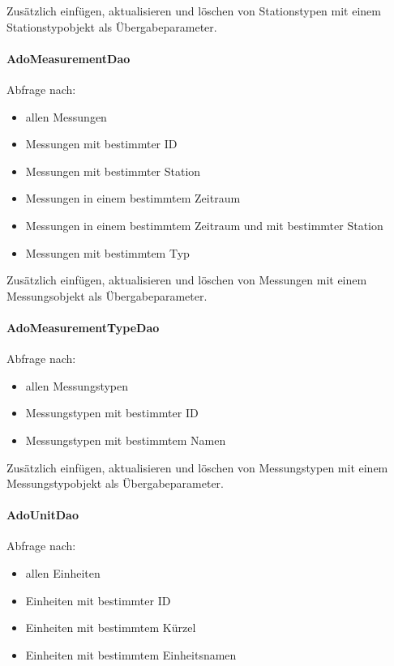 Zusätzlich einfügen, aktualisieren und löschen von Stationstypen mit
einem Stationstypobjekt als Übergabeparameter.


\paragraph{AdoMeasurementDao}\label{adomeasurementdao}

Abfrage nach:

\begin{itemize}

\item
  allen Messungen
\item
  Messungen mit bestimmter ID
\item
  Messungen mit bestimmter Station
\item
  Messungen in einem bestimmtem Zeitraum
\item
  Messungen in einem bestimmtem Zeitraum und mit bestimmter Station
\item
  Messungen mit bestimmtem Typ
\end{itemize}

Zusätzlich einfügen, aktualisieren und löschen von Messungen mit einem
Messungsobjekt als Übergabeparameter.


\paragraph{AdoMeasurementTypeDao}\label{adomeasurementtypedao}

Abfrage nach:

\begin{itemize}

\item
  allen Messungstypen
\item
  Messungstypen mit bestimmter ID
\item
  Messungstypen mit bestimmtem Namen
\end{itemize}

Zusätzlich einfügen, aktualisieren und löschen von Messungstypen mit
einem Messungstypobjekt als Übergabeparameter.


\paragraph{AdoUnitDao}\label{adounitdao}

Abfrage nach:

\begin{itemize}

\item
  allen Einheiten
\item
  Einheiten mit bestimmter ID
\item
  Einheiten mit bestimmtem Kürzel
\item
  Einheiten mit bestimmtem Einheitsnamen
\end{itemize}

